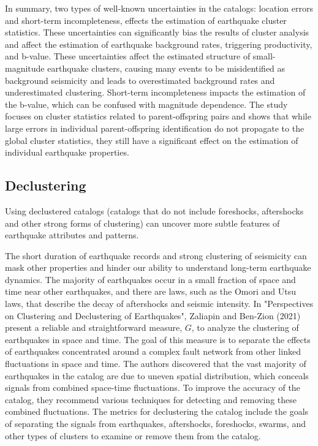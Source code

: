 \documentclass[12pt]{article} %
\theoremstyle{plain}
\begin{document}
	
	In summary, two types of well-known uncertainties in the catalogs: location errors and short-term incompleteness, effects the estimation of earthquake cluster statistics. These uncertainties can significantly bias the results of cluster analysis and affect the estimation of earthquake background rates, triggering productivity, and b-value. These uncertainties affect the estimated structure of small-magnitude earthquake clusters, causing many events to be misidentified as background seismicity and leads to overestimated background rates and underestimated clustering. Short-term incompleteness impacts the estimation of the b-value, which can be confused with magnitude dependence. The study focuses on cluster statistics related to parent-offspring pairs and shows that while large errors in individual parent-offspring identification do not propagate to the global cluster statistics, they still have a significant effect on the estimation of individual earthquake properties.
	
	
	
	\subsection{Declustering}
	
	Using declustered catalogs (catalogs that do not include foreshocks, aftershocks and other strong forms of clustering) can uncover more subtle features  of earthquake attributes and patterns. 

	The short duration of earthquake records and strong clustering of seismicity can mask other properties and hinder our ability to understand long-term earthquake dynamics. The majority of earthquakes occur in a small fraction of space and time near other earthquakes, and there are laws, such as the Omori and Utsu laws, that describe the decay of aftershocks and seismic intensity. In "Perspectives on Clustering and	Declustering of Earthquakes", Zaliapin and Ben-Zion (2021) present a reliable and straightforward measure, $G$, to analyze the clustering of earthquakes in space and time. The goal of this measure is to separate the effects of earthquakes concentrated around a complex fault network from other linked fluctuations in space and time. The authors discovered that the vast majority of earthquakes in the catalog are due to uneven spatial distribution, which conceals signals from combined space-time fluctuations. To improve the accuracy of the catalog, they recommend various techniques for detecting and removing these combined fluctuations. The metrics for declustering the catalog include the goals of separating the signals from earthquakes, aftershocks, foreshocks, swarms, and other types of clusters to examine or remove them from the catalog.
	
\end{document}
